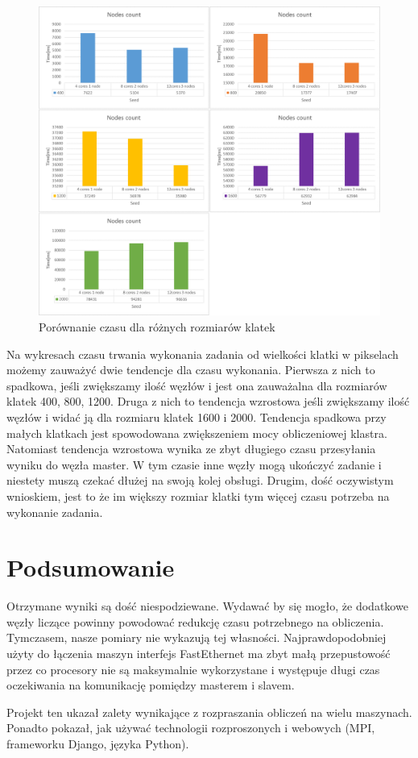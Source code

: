 \documentclass[a4paper]{article}
\begin{document}
\begin{figure}[H]
    \centering
    \includegraphics[width=\textwidth]{6.png}
    \caption{Porównanie czasu dla różnych rozmiarów klatek}
    \label{fig:my_frac}
\end{figure}

Na wykresach czasu trwania wykonania zadania od wielkości klatki w pikselach możemy zauważyć dwie tendencje dla czasu wykonania. Pierwsza z nich to spadkowa, jeśli zwiększamy ilość węzłów i jest ona zauważalna dla rozmiarów klatek 400, 800, 1200. Druga z nich to tendencja wzrostowa jeśli zwiększamy ilość węzłów i widać ją dla rozmiaru klatek 1600 i 2000. Tendencja spadkowa przy małych klatkach jest spowodowana zwiększeniem mocy obliczeniowej klastra. Natomiast tendencja wzrostowa wynika ze zbyt długiego czasu przesyłania wyniku do węzła master. W tym czasie inne węzły mogą ukończyć zadanie i niestety muszą czekać dłużej na swoją kolej obsługi. Drugim, dość oczywistym wnioskiem, jest to że im większy rozmiar klatki tym więcej czasu potrzeba na wykonanie zadania.

\section{Podsumowanie}
Otrzymane wyniki są dość niespodziewane. Wydawać by się mogło, że dodatkowe węzły liczące powinny powodować redukcję czasu potrzebnego na obliczenia. Tymczasem, nasze pomiary nie wykazują tej własności. Najprawdopodobniej użyty do łączenia maszyn interfejs FastEthernet ma zbyt małą przepustowość przez co procesory nie są maksymalnie wykorzystane i występuje długi czas oczekiwania na komunikację pomiędzy masterem i slavem.

Projekt ten ukazał zalety wynikające z rozpraszania obliczeń na wielu maszynach. Ponadto pokazał, jak używać technologii rozproszonych i webowych (MPI, frameworku Django, języka Python).

\newpage
\listoffigures
{}
\end{document}
